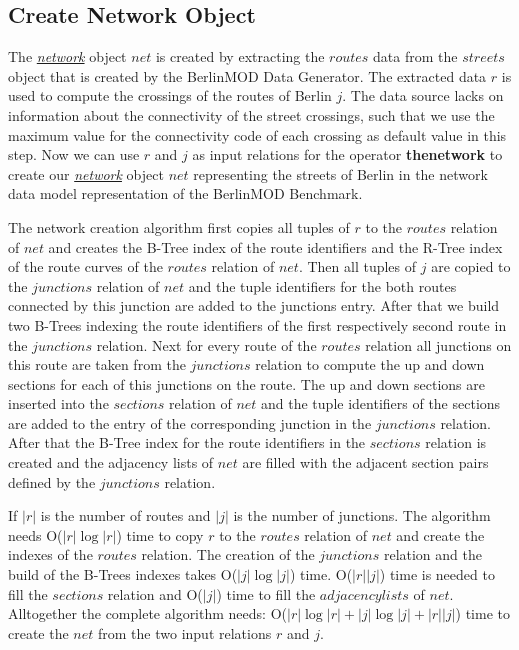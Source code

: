 \documentclass[a4paper]{article}
\newcommand{\bmodb} {BerlinMOD Benchmark}
\newcommand{\op}[1]{\textbf{#1}}
\newcommand{\dt}[1]{\textsl{\underline{#1}}}
\begin{document}
{\subsection{Create Network Object}
\label{sec:createNetwork}
The \dt{network} object $net$ is created by extracting the $routes$ data from
the $streets$ object that is created by the BerlinMOD Data Generator.
The extracted data $r$ is used to compute the crossings of the
routes of Berlin $j$. The data source lacks on information about the connectivity
of the street crossings, such that we use the maximum value for the connectivity
code of each crossing as default value in this step.
Now we can use $r$ and $j$ as input relations for the operator \op{thenetwork}
to create our \dt{network} object $net$ representing the streets of Berlin in
the network data model representation of the \bmodb{}.

The network creation algorithm first copies all tuples of $r$ to the
$routes$ relation of $net$ and creates the B-Tree index of the route
identifiers and the R-Tree index of the route curves of the $routes$ relation of
$net$. Then all tuples of $j$ are copied to the $junctions$ relation
of $net$ and the tuple identifiers for the both routes connected
by this junction are added to the junctions entry. After that we build two B-Trees
indexing the route identifiers of the first respectively second route in the
$junctions$ relation. Next for every route of the $routes$ relation all junctions
on this route are taken from the $junctions$ relation to compute the up and
down sections for each of this junctions on the route. The up and down
sections are inserted into the $sections$ relation of $net$ and the
tuple identifiers of the sections are added to the entry of the corresponding
junction in the $junctions$ relation. After that the B-Tree index for the
route identifiers in the $sections$ relation is created and the adjacency
lists of $net$ are filled with the adjacent section pairs defined by the
$junctions$ relation.

If $|r|$ is the number of routes and $|j|$ is the number of junctions.
The algorithm needs O($|r| \log |r|$) time to copy $r$ to the
$routes$ relation of $net$ and create the indexes of the
$routes$ relation. The creation of the $junctions$ relation and the build
of the B-Trees indexes takes O($|j| \log |j|$) time.
O($|r||j|$) time is needed to fill the $sections$ relation and
O($|j|$) time to fill the $adjacency lists$ of $net$. Alltogether
the complete algorithm needs:
O($|r| \log |r|+|j| \log |j| + |r||j|$)
 time to create the $net$ from the two input relations $r$ and $j$.
}
\end{document}
